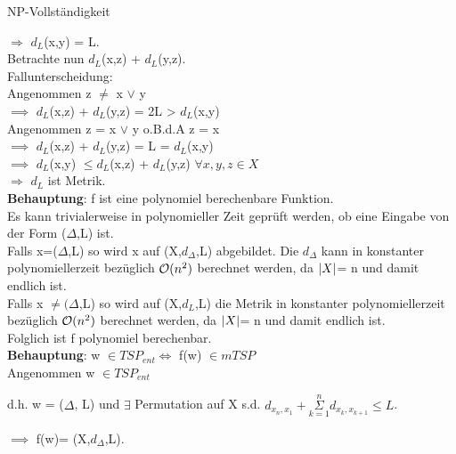 \documentclass[answers]{submit}
\begin{document}
\begin{exercise}[7]{NP-Vollständigkeit}
{  $\Rightarrow$ $d_L$(x,y) = L. \\

  Betrachte nun $d_L$(x,z) + $d_L$(y,z). \\

  Fallunterscheidung: \\

  Angenommen z $\neq$ x $\lor$ y \\

  $\implies$ $d_L$(x,z) + $d_L$(y,z) = 2L > $d_L$(x,y) \\

  Angenommen z = x $\lor$ y  o.B.d.A z = x\\

  $\implies$ $d_L$(x,z) + $d_L$(y,z) = L = $d_L$(x,y) \\

  $\implies$ $d_L$(x,y) $ \leq d_L$(x,z) + $d_L$(y,z) $\forall x,y,z \in X$  \\

  $\Rightarrow$ $d_L$ ist Metrik. \\

  \textbf{Behauptung}: f ist eine polynomiel berechenbare Funktion. \\

  Es kann trivialerweise in polynomieller Zeit geprüft werden, ob eine Eingabe von der Form ($\Delta$,L) ist. \\

  Falls x=($\Delta$,L) so wird x auf (X,$d_{\Delta}$,L) abgebildet. Die $d_{\Delta}$ kann in konstanter polynomiellerzeit bezüglich $\mathcal{O}(n^2)$ berechnet werden, da $\left\vert X \right\vert$= n und damit endlich ist. \\

  Falls x $ \neq (\Delta$,L) so wird auf (X,$d_L$,L) die Metrik in konstanter polynomiellerzeit bezüglich $\mathcal{O}(n^2)$ berechnet werden, da $\left\vert X \right\vert$= n und damit endlich ist. \\

    Folglich ist f polynomiel berechenbar. \\

    \textbf{Behauptung}: w $ \in TSP_{ent} \iff$ f(w) $ \in mTSP$ \\

    Angenommen w $ \in TSP_{ent} $

    d.h. w = ($\Delta$, L) und $\exists$ Permutation auf X s.d. $ d_{x_n,x_1} + \overset{n}{\underset{k=1}{\Sigma}} d_{x_k,x_{k+1}} \leq L$.

  $\implies$ f(w)= (X,$d_{\Delta}$,L). \\

}
\end{exercise}
\end{document}

